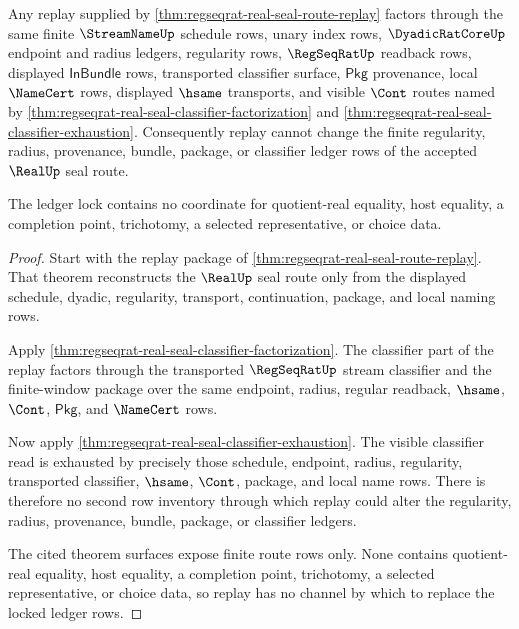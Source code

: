\begin{theorem}
\label{thm:regseqrat-real-seal-replay-ledger-lock}
Any replay supplied by
\autoref{thm:regseqrat-real-seal-route-replay} factors through the same
finite $\StreamNameUp$ schedule rows, unary index rows,
$\DyadicRatCoreUp$ endpoint and radius ledgers, regularity rows,
$\RegSeqRatUp$ readback rows, displayed $\mathsf{InBundle}$ rows,
transported classifier surface, $\mathsf{Pkg}$ provenance, local
$\NameCert$ rows, displayed $\hsame$ transports, and visible $\Cont$ routes
named by \autoref{thm:regseqrat-real-seal-classifier-factorization} and
\autoref{thm:regseqrat-real-seal-classifier-exhaustion}. Consequently replay
cannot change the finite regularity, radius, provenance, bundle, package, or
classifier ledger rows of the accepted $\RealUp$ seal route.

The ledger lock contains no coordinate for quotient-real equality, host
equality, a completion point, trichotomy, a selected representative, or choice
data.
\end{theorem}
\begin{proof}
Start with the replay package of
\autoref{thm:regseqrat-real-seal-route-replay}. That theorem reconstructs the
$\RealUp$ seal route only from the displayed schedule, dyadic, regularity,
transport, continuation, package, and local naming rows.

Apply \autoref{thm:regseqrat-real-seal-classifier-factorization}. The
classifier part of the replay factors through the transported
$\RegSeqRatUp$ stream classifier and the finite-window package over the same
endpoint, radius, regular readback, $\hsame$, $\Cont$, $\mathsf{Pkg}$, and
$\NameCert$ rows.

Now apply \autoref{thm:regseqrat-real-seal-classifier-exhaustion}. The visible
classifier read is exhausted by precisely those schedule, endpoint, radius,
regularity, transported classifier, $\hsame$, $\Cont$, package, and local
name rows. There is therefore no second row inventory through which replay
could alter the regularity, radius, provenance, bundle, package, or
classifier ledgers.

The cited theorem surfaces expose finite route rows only. None contains
quotient-real equality, host equality, a completion point, trichotomy, a
selected representative, or choice data, so replay has no channel by which to
replace the locked ledger rows.
\end{proof}

